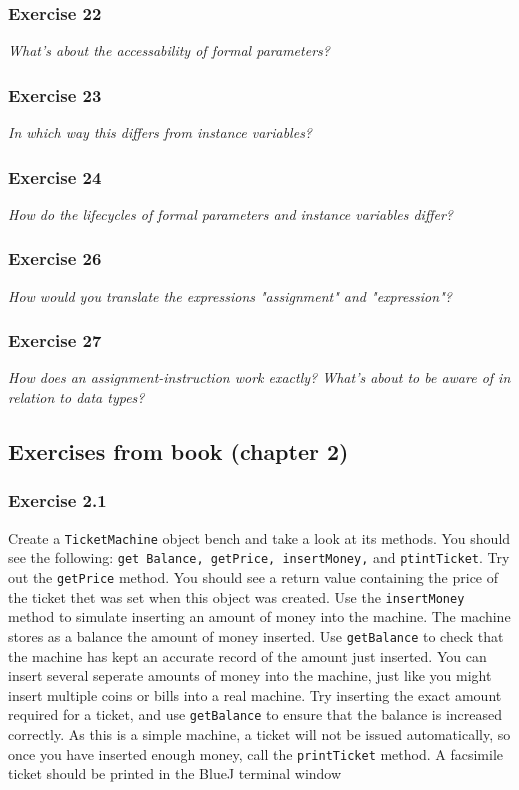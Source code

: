 \subsubsection*{Exercise 22}
\textit{What's about the accessability of formal parameters?}\\

\subsubsection*{Exercise 23}
\textit{In which way this differs from instance variables?}\\

\subsubsection*{Exercise 24}
\textit{How do the lifecycles of formal parameters and instance variables 
	differ?}\\

\subsubsection*{Exercise 26}
\textit{How would you translate the expressions "assignment" and 
	"expression"?}\\

\subsubsection*{Exercise 27}
\textit{How does an assignment-instruction work exactly? What's about to 
	be aware of in relation to data types?}\\

\subsection{Exercises from book (chapter 2)}
\subsubsection{Exercise 2.1}
Create a \verb?TicketMachine? object bench and take a look at its methods. You 
should see the following: \verb?get Balance, getPrice, insertMoney,? and 
\verb?ptintTicket?. Try out the \verb?getPrice? method. You should see a 
return value containing the price of the ticket thet was set when this object 
was created. Use the \verb?insertMoney? method to simulate inserting an amount 
of money into the machine. The machine stores as a balance the amount of money 
inserted. Use \verb?getBalance? to check that the machine has kept an accurate 
record of the amount just inserted. You can insert several seperate amounts of 
money into the machine, just like you might insert multiple coins or bills into 
a real machine. Try inserting the exact amount required for a ticket, and use 
\verb?getBalance? to ensure that the balance is increased correctly. As this is 
a simple machine, a ticket will not be issued automatically, so once you have 
inserted enough money, call the \verb?printTicket? method. A facsimile ticket 
should be printed in the BlueJ terminal window

